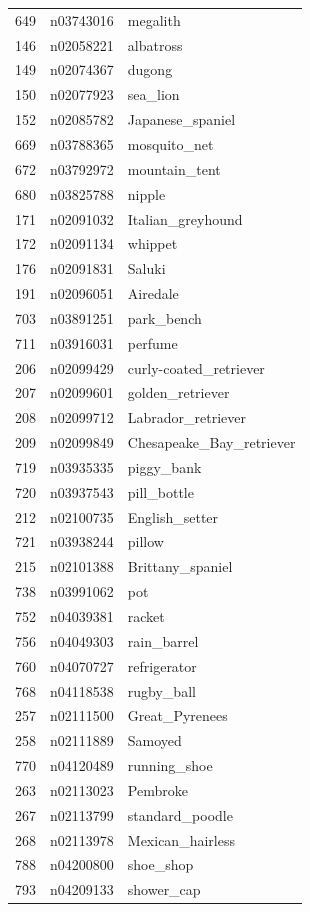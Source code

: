\begin{table}
\begin{tabular}{cll}
649 & n03743016 & megalith \\
146 & n02058221 & albatross \\
149 & n02074367 & dugong \\
150 & n02077923 & sea_lion \\
152 & n02085782 & Japanese_spaniel \\
669 & n03788365 & mosquito_net \\
672 & n03792972 & mountain_tent \\
680 & n03825788 & nipple \\
171 & n02091032 & Italian_greyhound \\
172 & n02091134 & whippet \\
176 & n02091831 & Saluki \\
191 & n02096051 & Airedale \\
703 & n03891251 & park_bench \\
711 & n03916031 & perfume \\
206 & n02099429 & curly-coated_retriever \\
207 & n02099601 & golden_retriever \\
208 & n02099712 & Labrador_retriever \\
209 & n02099849 & Chesapeake_Bay_retriever \\
719 & n03935335 & piggy_bank \\
720 & n03937543 & pill_bottle \\
212 & n02100735 & English_setter \\
721 & n03938244 & pillow \\
215 & n02101388 & Brittany_spaniel \\
738 & n03991062 & pot \\
752 & n04039381 & racket \\
756 & n04049303 & rain_barrel \\
760 & n04070727 & refrigerator \\
768 & n04118538 & rugby_ball \\
257 & n02111500 & Great_Pyrenees \\
258 & n02111889 & Samoyed \\
770 & n04120489 & running_shoe \\
263 & n02113023 & Pembroke \\
267 & n02113799 & standard_poodle \\
268 & n02113978 & Mexican_hairless \\
788 & n04200800 & shoe_shop \\
793 & n04209133 & shower_cap \\

\end{tabular}
\end{table}
